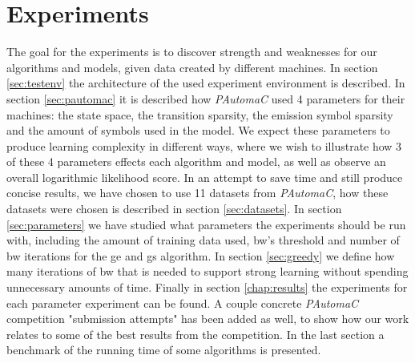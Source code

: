 \chapter{Experiments}
\label{chap:experiments}

The goal for the experiments is to discover strength and weaknesses for our algorithms and models, given data created by different machines. In section \ref{sec:testenv} the architecture of the used experiment environment is described. In section \ref{sec:pautomac} it is described how \emph{PAutomaC} used 4 parameters for their machines: the state space, the transition sparsity, the emission symbol sparsity and the amount of symbols used in the model. We expect these parameters to produce learning complexity in different ways, where we wish to illustrate how 3 of these 4 parameters effects each algorithm and model, as well as observe an overall logarithmic likelihood score. In an attempt to save time and still produce concise results, we have chosen to use 11 datasets from \emph{PAutomaC}, how these datasets were chosen is described in section \ref{sec:datasets}. In section \ref{sec:parameters} we have studied what parameters the experiments should be run with, including the amount of training data used, \gls{bw}'s threshold and number of \gls{bw} iterations for the \gls{ge} and \gls{gs} algorithm. In section \ref{sec:greedy} we define how many iterations of \gls{bw} that is needed to support strong learning without spending unnecessary amounts of time.
Finally in section \ref{chap:results} the experiments for each parameter experiment can be found. A couple concrete \emph{PAutomaC} competition "submission attempts" has been added as well, to show how our work relates to some of the best results from the competition. In the last section a benchmark of the running time of some algorithms is presented.

%



\FloatBarrier


